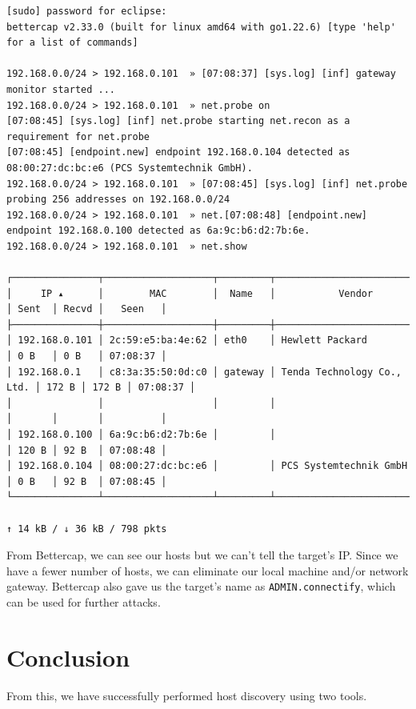 \documentclass[a4paper,12pt]{article}
\begin{document}
\begin{verbatim}
[sudo] password for eclipse: 
bettercap v2.33.0 (built for linux amd64 with go1.22.6) [type 'help' for a list of commands]

192.168.0.0/24 > 192.168.0.101  » [07:08:37] [sys.log] [inf] gateway monitor started ...
192.168.0.0/24 > 192.168.0.101  » net.probe on
[07:08:45] [sys.log] [inf] net.probe starting net.recon as a requirement for net.probe
[07:08:45] [endpoint.new] endpoint 192.168.0.104 detected as 08:00:27:dc:bc:e6 (PCS Systemtechnik GmbH).
192.168.0.0/24 > 192.168.0.101  » [07:08:45] [sys.log] [inf] net.probe probing 256 addresses on 192.168.0.0/24
192.168.0.0/24 > 192.168.0.101  » net.[07:08:48] [endpoint.new] endpoint 192.168.0.100 detected as 6a:9c:b6:d2:7b:6e.
192.168.0.0/24 > 192.168.0.101  » net.show

┌───────────────┬───────────────────┬─────────┬────────────────────────────┬───────┬───────┬──────────┐
│     IP ▴      │        MAC        │  Name   │           Vendor           │ Sent  │ Recvd │   Seen   │
├───────────────┼───────────────────┼─────────┼────────────────────────────┼───────┼───────┼──────────┤
│ 192.168.0.101 │ 2c:59:e5:ba:4e:62 │ eth0    │ Hewlett Packard            │ 0 B   │ 0 B   │ 07:08:37 │
│ 192.168.0.1   │ c8:3a:35:50:0d:c0 │ gateway │ Tenda Technology Co., Ltd. │ 172 B │ 172 B │ 07:08:37 │
│               │                   │         │                            │       │       │          │
│ 192.168.0.100 │ 6a:9c:b6:d2:7b:6e │         │                            │ 120 B │ 92 B  │ 07:08:48 │
│ 192.168.0.104 │ 08:00:27:dc:bc:e6 │         │ PCS Systemtechnik GmbH     │ 0 B   │ 92 B  │ 07:08:45 │
└───────────────┴───────────────────┴─────────┴────────────────────────────┴───────┴───────┴──────────┘

↑ 14 kB / ↓ 36 kB / 798 pkts

\end{verbatim}

From Bettercap, we can see our hosts but we can't tell the target's IP. Since we have a fewer number of hosts, we can eliminate our local machine and/or network gateway. Bettercap also gave us the target's name as \texttt{ADMIN.connectify}, which can be used for further attacks.

\section{Conclusion}

From this, we have successfully performed host discovery using two tools.
\end{document}
